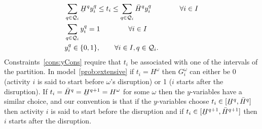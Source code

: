 \documentclass[11pt]{article}
\newcommand{\cQ}{{\cal Q}}
\renewcommand{\underbar}{\underaccent{\bar}}
\begin{document}
	\begin{subequations} \label{cons:yCons}
		\begin{align}
		& \sum_{q \in \cQ_i} \underbar{H}^q y_i^{q} \leq t_i \leq \sum_{q \in \cQ_i} \bar{H}^q y_i^{q} \qquad \qquad \forall i \in I \label{cons:tyBounds}\\
		& \sum_{q \in \cQ_i} y_i^q = 1 \qquad \qquad \forall i \in I \label{cons:sumy1} \\
		& y_i^q \in \{0,1\}, \quad \quad \forall i \in I, q \in \cQ_i.
		\end{align}
	\end{subequations}
	{Constraints~\eqref{cons:yCons} require that \(t_i\) be associated with one of the intervals of the partition. In model~\eqref{prob:extensive} if $t_i=H^\omega$ then $G_i^\omega$ can either be 0 (activity $i$ is said to start before $\omega$'s disruption) or 1 ($i$ starts after the disruption). If $t_i=\bar{H}^q = \underbar{H}^{q + 1}=H^\omega$ for some $\omega$ then the $y$-variables have a similar choice, and our convention is that if the $y$-variables choose $t_i \in [\underbar{H}^q,\bar{H}^q]$ then activity $i$ is said to start before the disruption and if $t_i \in [\underbar{H}^{q+1},\bar{H}^{q+1}]$ then $i$ starts after the disruption.}
\end{document}

